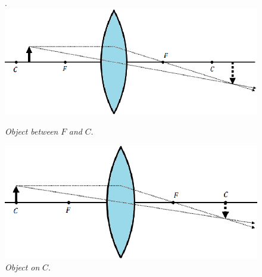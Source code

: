 \documentclass{scrartcl}
\begin{document}
    \begin{figure}[H]
        \centering
        \begin{minipage}[b]{0.49\textwidth}.
        \includegraphics[width=\textwidth]{convex3.eps}
        \caption{\textit{Object between} $F$ \textit{and} $C$.}
        \end{minipage}
        \hfill
        \begin{minipage}[b]{0.49\textwidth}
            \includegraphics[width=\textwidth]{convex4.eps}
            \caption{\textit{Object on} $C$.}
        \end{minipage}
    \end{figure}
\end{document}
